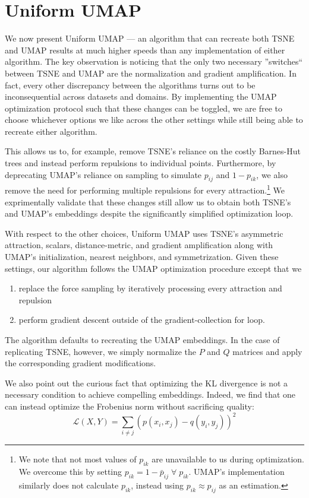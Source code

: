 \documentclass[sigconf, nonacm]{acmart}
\newcommand\ourmethod{Uniform UMAP }
\begin{document}
\section{\ourmethod} \label{uniform}
We now present \ourmethod  --- an algorithm that can recreate both TSNE and UMAP results at much higher speeds than any implementation of either algorithm.
The key observation is noticing that the only two necessary ''switches`` between TSNE and UMAP are the normalization and gradient amplification. In fact,
every other discrepancy between the algorithms turns out to be inconsequential across datasets and domains.
By implementing the UMAP optimization protocol such that these changes can be toggled,
we are free to choose whichever options we like across the other settings while still being able to recreate either algorithm.

This allows us to, for example, remove TSNE's reliance on the costly Barnes-Hut trees and instead perform repulsions to individual points.
Furthermore, by deprecating UMAP's reliance on sampling to simulate $p_{ij}$ and $1 - p_{ik}$, we also remove the need for performing multiple repulsions for every
attraction.\footnote{We note that not most values of $p_{ik}$ are unavailable to us during optimization. We overcome this by setting $p_{ik} = 1 - \bar{p}_{ij}
\; \forall \; p_{ik}$. UMAP's implementation similarly does not calculate $p_{ik}$, instead using $p_{ik} \approx p_{ij}$ as an estimation.} We exprimentally
validate that these changes still allow us to obtain both TSNE's and UMAP's embeddings despite the significantly simplified optimization loop.

With respect to the other choices, \ourmethod  uses TSNE's asymmetric attraction, scalars, distance-metric, and gradient amplification along with UMAP's
initialization, nearest neighbors, and symmetrization. Given these settings, our algorithm follows the UMAP optimization procedure except that we
\begin{enumerate}
        \item replace the force sampling by iteratively processing every attraction and repulsion
        \item perform gradient descent outside of the gradient-collection for loop.
\end{enumerate}
The algorithm defaults to recreating the UMAP embeddings. In the case of replicating TSNE, however, we simply normalize the $P$ and $Q$ matrices and apply the
corresponding gradient modifications.

We also point out the curious fact that optimizing the KL divergence is not a necessary condition to achieve compelling embeddings. Indeed, we find that one can
instead optimize the Frobenius norm without sacrificing quality:
\[ \mathcal{L}(X, Y) = \sum_{i \neq j} (p(x_i, x_j) - q(y_i, y_j))^2 \]
\end{document}
